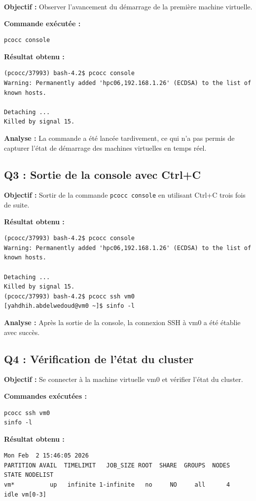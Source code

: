 \documentclass[12pt,a4paper]{article}
\newcommand{\code}[1]{\texttt{#1}}
\begin{document}
\textbf{Objectif :} Observer l'avancement du démarrage de la première machine virtuelle.

\textbf{Commande exécutée :}
\begin{lstlisting}
pcocc console
\end{lstlisting}

\textbf{Résultat obtenu :}
\begin{lstlisting}
(pcocc/37993) bash-4.2$ pcocc console
Warning: Permanently added 'hpc06,192.168.1.26' (ECDSA) to the list of known hosts.

Detaching ...
Killed by signal 15.
\end{lstlisting}

\textbf{Analyse :} La commande a été lancée tardivement, ce qui n'a pas permis de capturer l'état de démarrage des machines virtuelles en temps réel.

\subsection{Q3 : Sortie de la console avec Ctrl+C}

\textbf{Objectif :} Sortir de la commande \code{pcocc console} en utilisant Ctrl+C trois fois de suite.

\textbf{Résultat obtenu :}
\begin{lstlisting}
(pcocc/37993) bash-4.2$ pcocc console
Warning: Permanently added 'hpc06,192.168.1.26' (ECDSA) to the list of known hosts.

Detaching ...
Killed by signal 15.
(pcocc/37993) bash-4.2$ pcocc ssh vm0
[yahdhih.abdelwedoud@vm0 ~]$ sinfo -l
\end{lstlisting}

\textbf{Analyse :} Après la sortie de la console, la connexion SSH à vm0 a été établie avec succès.

\subsection{Q4 : Vérification de l'état du cluster}

\textbf{Objectif :} Se connecter à la machine virtuelle vm0 et vérifier l'état du cluster.

\textbf{Commandes exécutées :}
\begin{lstlisting}
pcocc ssh vm0
sinfo -l
\end{lstlisting}

\textbf{Résultat obtenu :}
\begin{lstlisting}
Mon Feb  2 15:46:05 2026
PARTITION AVAIL  TIMELIMIT   JOB_SIZE ROOT  SHARE  GROUPS  NODES  STATE NODELIST
vm*          up   infinite 1-infinite   no     NO     all      4   idle vm[0-3]
\end{lstlisting}
\end{document}
